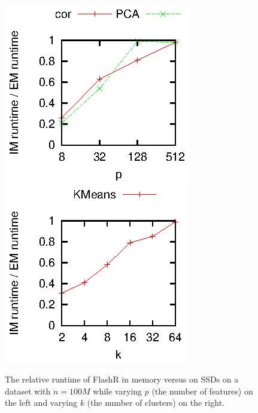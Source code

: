 \begin{figure}[t]
	\begin{center}
		\footnotesize
		\includegraphics{FlashMatrix_figs/IM-vs-EM-stat.eps}
		\includegraphics{FlashMatrix_figs/IM-vs-EM-clust.eps}
		\caption{The relative runtime of FlashR in memory versus on SSDs
		on a dataset with $n=100M$ while varying $p$ (the number of features)
		on the left and varying $k$ (the number of clusters) on the right.
		}
		\label{perf:stat}
	\end{center}
  \vspace{-15pt}
\end{figure}


